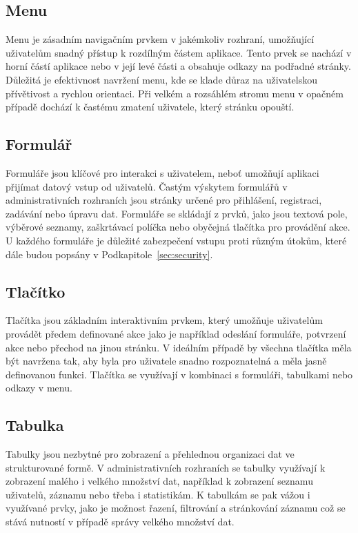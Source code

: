 \subsection*{Menu}
\label{subsec:admin-tags-menu}
Menu je zásadním navigačním prvkem v jakémkoliv rozhraní, umožňující uživatelům snadný přístup k rozdílným částem aplikace. Tento prvek se nachází v horní částí aplikace nebo v její levé části a obsahuje odkazy na podřadné stránky. Důležitá je efektivnost navržení menu, kde se klade důraz na uživatelskou přívětivost a rychlou orientaci. Při velkém a rozsáhlém stromu menu v opačném případě dochází k častému zmatení uživatele, který stránku opouští.

\subsection*{Formulář}
\label{subsec:admin-tags-form}
Formuláře jsou klíčové pro interakci s uživatelem, neboť umožňují aplikaci přijímat datový vstup od uživatelů. Častým výskytem formulářů v administrativních rozhraních jsou stránky určené pro přihlášení, registraci, zadávání nebo úpravu dat. Formuláře se skládají z prvků, jako jsou textová pole, výběrové seznamy, zaškrtávací políčka nebo obyčejná tlačítka pro provádění akce. U každého formuláře je důležité zabezpečení vstupu proti různým útokům, které dále budou popsány v Podkapitole~\ref{sec:security}.

\subsection*{Tlačítko}
\label{subsec:admin-tags-button}
Tlačítka jsou základním interaktivním prvkem, který umožňuje uživatelům provádět předem definované akce jako je například odeslání formuláře, potvrzení akce nebo přechod na jinou stránku. V ideálním případě by všechna tlačítka měla být navržena tak, aby byla pro uživatele snadno rozpoznatelná a měla jasně definovanou funkci. Tlačítka se využívají v kombinaci s formuláři, tabulkami nebo odkazy v menu.

\subsection*{Tabulka}
\label{subsec:admin-tags-table}
Tabulky jsou nezbytné pro zobrazení a přehlednou organizaci dat ve strukturované formě. V administrativních rozhraních se tabulky využívají k zobrazení malého i velkého množství dat, například k zobrazení seznamu uživatelů, záznamu nebo třeba i statistikám. K tabulkám se pak vážou i využívané prvky, jako je možnost řazení, filtrování a stránkování záznamu což se stává nutností v případě správy velkého množství dat.

